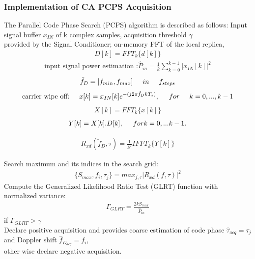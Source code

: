 \subsubsection{Implementation of CA PCPS Acquisition}
The Parallel Code Phase Search (PCPS) algorithm is described as follows:
Input signal buffer $x_{IN}$ of k complex samples, acquisition threshold $\gamma$\\
provided by the Signal Conditioner; on-memory FFT of the local replica,
\begin{align}
D[k]=FFT_k\{d[k]\}
\end{align}
\begin{align}
\text{input signal power estimation :} \hat P_{in} = \frac{1}{k}\sum_{k=0}^{k-1} \big| x_{IN}[k]\big| ^2
\end{align}
\begin{align}
\check f_D=[ f_{min}, f_{max}]\hspace{0.5cm} in \hspace{0.5cm}f_{steps} 
\end{align}
\begin{align}
\text{carrier wipe off:}\hspace{0.5cm}x[k]=x_{IN}[k]e^{-(j2 \pi \check f_D k T_s)},\hspace{0.5cm}for\hspace{0.5cm}k=0,...,k-1
\end{align}
\begin{align}
X[k]=FFT_k\{x[k]\}
\end{align}
\begin{align}
Y[k]=X[k].D[k],\hspace{0.5cm} for k=0,...k-1. 
\end{align}

\begin{align}
R_{xd}(\check f_D,\tau) = \frac{1}{k^2}IFFT_k\{Y[k]\}
\end{align}

Search maximum and its indices in the search grid:
\begin{align}
\{S_{max},f_i,\tau_j\} = max_{f,\tau} \big |R_{xd}(f,\tau)\big | ^2
\end{align}
Compute the Generalized Likelihood Ratio Test (GLRT) function with normalized variance:
\begin{align}
\Gamma_{GLRT} = \frac{2kS_{max}}{\hat P_{in}}
\end{align}
if $\Gamma_{GLRT} > \gamma$\\
Declare positive acquisition and provides coarse estimation of code phase $\hat \tau_{acq} = \tau_j $and Doppler shift $\hat f_{D_{acq}}=f_i$,\\
other wise declare negative acquisition.

